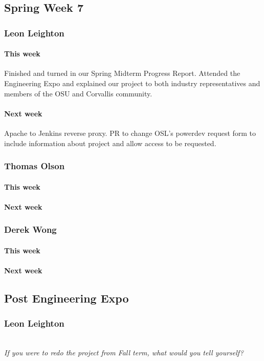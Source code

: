 \documentclass[10pt,letterpaper,onecolumn,draftclsnofoot]{IEEEtran}
\begin{document}
\subsection{Spring Week 7}
\subsubsection{Leon Leighton}
\paragraph{This week}Finished and turned in our Spring Midterm Progress Report.  
Attended the Engineering Expo and explained our project to both industry representatives and members of the OSU and Corvallis community.  
\paragraph{Next week}Apache to Jenkins reverse proxy.  
PR to change OSL's powerdev request form to include information about project and allow access to be requested.


\subsubsection{Thomas Olson}
\paragraph{This week}
\paragraph{Next week}


\subsubsection{Derek Wong}
\paragraph{This week}
\paragraph{Next week}

\subsection{Post Engineering Expo}
\subsubsection{Leon Leighton}
\textit{\\If you were to redo the project from Fall term, what would you tell yourself?}
\end{document}
